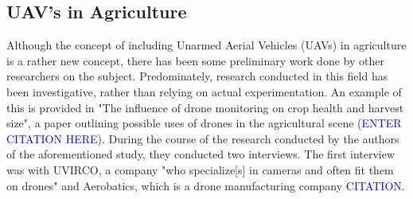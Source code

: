 \subsection{UAV's in Agriculture}
Although the concept of including Unarmed Aerial Vehicles (UAVs) in agriculture is a rather new concept, there has been some preliminary work done by other researchers on the subject.
Predominately, research conducted in this field has been investigative, rather than relying on actual experimentation.
An example of this is provided in "The influence of drone monitoring on crop health and harvest size", a paper outlining possible uses of drones in the agricultural scene \textcolor{blue}{(ENTER CITATION HERE)}.
During the course of the research conducted by the authors of the aforementioned study, they conducted two interviews. The first interview was with UVIRCO, a company "who specialize[s] in cameras and often fit them on drones" and Aerobatics, which is a drone manufacturing company \textcolor{blue}{CITATION}. 